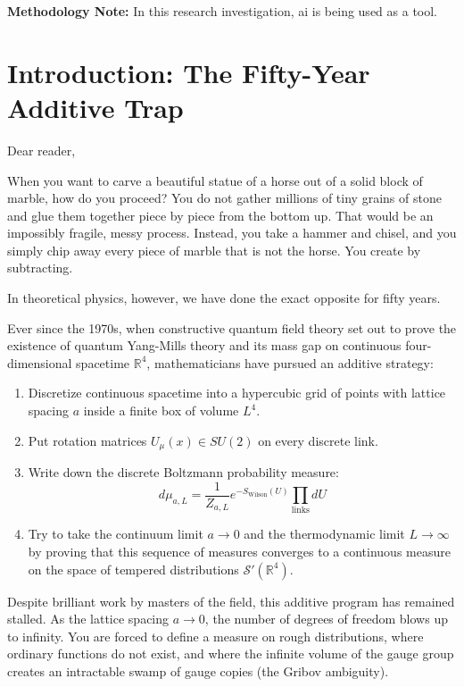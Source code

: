 \documentclass[11pt,a4paper]{article}
\begin{document}
\vspace{0.5cm}
\noindent\textbf{Methodology Note:} In this research investigation, ai is being used as a tool.

\newpage
\tableofcontents
\newpage

\section{Introduction: The Fifty-Year Additive Trap}

Dear reader,

When you want to carve a beautiful statue of a horse out of a solid block of marble, how do you proceed? You do not gather millions of tiny grains of stone and glue them together piece by piece from the bottom up. That would be an impossibly fragile, messy process. Instead, you take a hammer and chisel, and you simply chip away every piece of marble that is not the horse. You create by subtracting.

In theoretical physics, however, we have done the exact opposite for fifty years.

Ever since the 1970s, when constructive quantum field theory set out to prove the existence of quantum Yang-Mills theory and its mass gap on continuous four-dimensional spacetime $\mathbb{R}^4$, mathematicians have pursued an additive strategy:
\begin{enumerate}
    \item Discretize continuous spacetime into a hypercubic grid of points with lattice spacing $a$ inside a finite box of volume $L^4$.
    \item Put rotation matrices $U_\mu(x) \in SU(2)$ on every discrete link.
    \item Write down the discrete Boltzmann probability measure:
    $$d\mu_{a, L} = \frac{1}{Z_{a, L}} e^{-S_{\mathrm{Wilson}}(U)} \prod_{\mathrm{links}} dU$$
    \item Try to take the continuum limit $a \to 0$ and the thermodynamic limit $L \to \infty$ by proving that this sequence of measures converges to a continuous measure on the space of tempered distributions $\mathcal{S}'(\mathbb{R}^4)$.
\end{enumerate}

Despite brilliant work by masters of the field, this additive program has remained stalled. As the lattice spacing $a \to 0$, the number of degrees of freedom blows up to infinity. You are forced to define a measure on rough distributions, where ordinary functions do not exist, and where the infinite volume of the gauge group creates an intractable swamp of gauge copies (the Gribov ambiguity).
\end{document}
